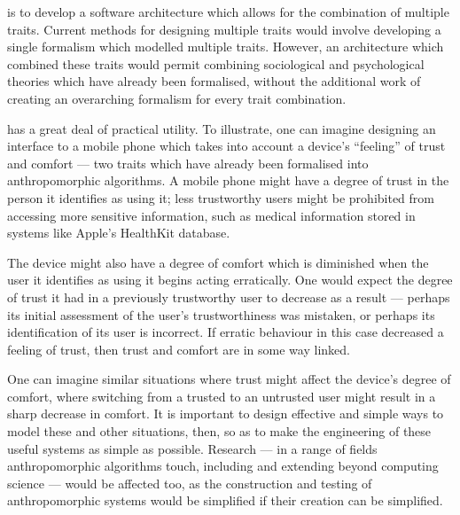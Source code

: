 \bigskip %

 is to develop a software architecture which allows for the combination of multiple traits. Current methods for designing multiple traits would involve developing a single formalism which modelled multiple traits. However, an architecture which combined these traits would permit combining sociological and psychological theories which have already been formalised, without the additional work of creating an overarching formalism for every trait combination.

 has a great deal of practical utility. To illustrate, one can imagine designing an interface to a mobile phone which takes into account a device's ``feeling'' of trust and comfort --- two traits which have already been formalised into anthropomorphic algorithms.\cite{Marsh2011, marsh1994} A mobile phone might have a degree of trust in the person it identifies as using it; less trustworthy users might be prohibited from accessing more sensitive information, such as medical information stored in systems like Apple's HealthKit database.\par

The device might also have a degree of comfort which is diminished when the user it identifies as using it begins acting erratically. One would expect the degree of trust it had in a previously trustworthy user to decrease as a result --- perhaps its initial assessment of the user's trustworthiness was mistaken, or perhaps its identification of its user is incorrect. If erratic behaviour in this case decreased a feeling of trust, then trust and comfort are in some way linked. \par

One can imagine similar situations where trust might affect the device's degree of comfort, where switching from a trusted to an untrusted user might result in a sharp decrease in comfort. It is important to design effective and simple ways to model these and other situations, then, so as to make the engineering of these useful systems as simple as possible. Research --- in a range of fields anthropomorphic algorithms touch, including and extending beyond computing science --- would be affected too, as the construction and testing of anthropomorphic systems would be simplified if their creation can be simplified.\par

